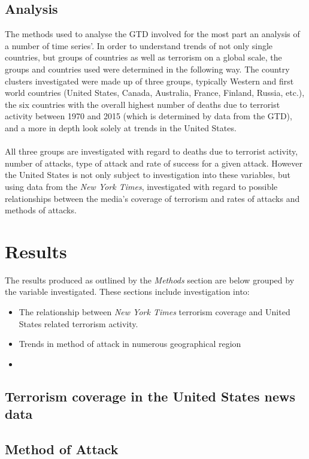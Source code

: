 \documentclass[10pt,a4paper]{article}
\begin{document}
\subsection{Analysis}
The methods used to analyse the GTD involved for the most part an analysis of a number of time series'. In order to understand trends of not only single countries, but groups of countries as well as terrorism on a global scale, the groups and countries used were determined in the following way. The country clusters investigated were made up of three groups, typically Western and first world countries (United States, Canada, Australia, France, Finland, Russia, etc.), the six countries with the overall highest number of deaths due to terrorist activity between 1970 and 2015 (which is determined by data from the GTD), and a more in depth look solely at trends in the United States.
\\\\
All three groups are investigated with regard to deaths due to terrorist activity, number of attacks, type of attack and rate of success for a given attack. However the United States is not only subject to investigation into these variables, but using data from the \textit{New York Times}, investigated with regard to possible relationships between the media's coverage of terrorism and rates of attacks and methods of attacks.


\section{Results}
The results produced as outlined by the \textit{Methods} section are below grouped by the variable investigated. These sections include investigation into:\\
\begin{itemize}
\item The relationship between \textit{New York Times} terrorism coverage and United States related terrorism activity.
\item Trends in method of attack in numerous geographical region
\item 

\end{itemize}

\subsection{Terrorism coverage in the United States news data}

\subsection{Method of Attack}
\end{document}
